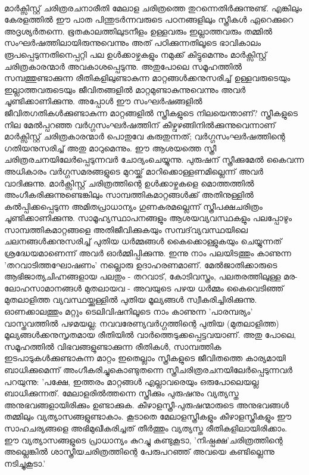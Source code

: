 \paragraph{} മാർക്സിസ്റ്റ് ചരിത്രരചനാരീതി മേലാള ചരിത്രത്തെ തുറന്നെതിർക്കുന്നുണ്ട്. എങ്കിലും കേരളത്തിൽ ഈ പാത പിന്തുടർന്നവരുടെ പഠനങ്ങളിലും സ്ത്രീകൾ ഏറെക്കുറെ അദൃശ്യർതന്നെ. ഭൂതകാലത്തിലുടനീളം ഉള്ളവരും ഇല്ലാത്തവരും തമ്മിൽ സംഘർഷത്തിലായിരുന്നുവെന്നും അത് പഠിക്കുന്നതിലൂടെ ഭാവികാലം രൂപപ്പെടുന്നതിനെപ്പറ്റി പല ഉൾക്കാഴ്ചകളും നമുക്ക് കിട്ടുമെന്നും മാർക്സിസ്റ്റ് ചരിത്രകാരന്മാർ അവകാശപ്പെടുന്നു. അതുപോലെ സമൂഹത്തിൽ സമ്പത്തുണ്ടാക്കുന്ന രീതികളിലുണ്ടാകുന്ന മാറ്റങ്ങൾക്കനുസരിച്ച് ഉള്ളവരുടെയും ഇല്ലാത്തവരുടെയും ജീവിതങ്ങളിൽ മാറ്റമുണ്ടാകുന്നുവെന്നും അവർ ചൂണ്ടിക്കാണിക്കുന്നു. അപ്പോൾ ഈ സംഘർഷങ്ങളിൽ ജീവിതഗതികൾക്കുണ്ടാകുന്ന മാറ്റങ്ങളിൽ സ്ത്രീകളുടെ നിലയെന്താണ്? സ്ത്രീകളുടെ നില മേൽപ്പറഞ്ഞ വർഗ്ഗസംഘർഷത്തിന് കീഴ്വഴങ്ങിനിൽക്കുന്നുവെന്നാണ് മാർക്സിസ്റ്റ് ചരിത്രകാരന്മാർ പൊതുവേ കരുതുന്നത്; വർഗ്ഗസംഘർഷത്തിന്റെ ഗതിയനുസരിച്ച് അതു മാറുമെന്നും. ഈ ആശയത്തെ സ്ത്രീ ചരിത്രരചനയിലേർപ്പെടുന്നവർ ചോദ്യംചെയ്യുന്നു. പുരുഷന് സ്ത്രീക്കുമേൽ കൈവന്ന അധികാരം വർഗ്ഗസമരങ്ങളുടെ മുറയ്ക്ക് മാറിക്കൊള്ളണമില്ലെന്ന് അവർ വാദിക്കുന്നു. മാർക്സിസ്റ്റ് ചരിത്രത്തിന്റെ ഉൾക്കാഴ്ചകളെ മൊത്തത്തിൽ അംഗീകരിക്കുന്നുണ്ടെങ്കിലും സാമ്പത്തികമാറ്റങ്ങൾക്ക് അതിനുള്ളിൽ കൽപ്പിക്കപ്പെടുന്ന അമിതപ്രാധാന്യം ഗുണകരമല്ലെന്ന് സ്ത്രീപക്ഷചരിത്രം ചൂണ്ടിക്കാണിക്കുന്നു. സാമൂഹ്യസ്ഥാപനങ്ങളും ആശയവ്യവസ്ഥകളും പലപ്പോഴും സാമ്പത്തികമാറ്റങ്ങളെ അതിജീവിക്കുകയും സമ്പദ്‌വ്യവസ്ഥയിലെ ചലനങ്ങൾക്കനുസരിച്ച് പുതിയ ധർമ്മങ്ങൾ കൈക്കൊള്ളുകയും ചെയ്യുന്നത് ശ്രദ്ധേയമാണെന്ന് അവർ ഓർമ്മിപ്പിക്കുന്നു. ഇന്നു നാം പലയിടത്തും കാണുന്ന 'തറവാടിത്തഘോഷണം' നല്ലൊരു ഉദാഹരണമാണ്. മേൽജാതിക്കാരുടെ ആഭിജാത്യചിഹ്നങ്ങളായ പലതും - തറവാട്, കോടിവസ്ത്രം, പലതരത്തിലുള്ള മര-ലോഹസാമാനങ്ങൾ മുതലായവ - അവയുടെ പഴയ ധർമ്മം കൈവെടിഞ്ഞ് മുതലാളിത്ത വ്യവസ്ഥയ്ക്കുള്ളിൽ പുതിയ മൂല്യങ്ങൾ സ്വീകരിച്ചിരിക്കുന്നു. ഓണക്കാലത്തും മറ്റും ടെലിവിഷനിലൂടെ നാം കാണുന്ന 'പാരമ്പര്യം' വാസ്തവത്തിൽ പഴമയല്ല; നവവരേണ്യവർഗ്ഗത്തിന്റെ പുതിയ (മുതലാളിത്ത) മൂല്യങ്ങൾക്കനുസൃതമായ രീതിയിൽ വാർത്തെടുക്കപ്പെട്ടവയാണ്. അതു പോലെ, സമൂഹത്തിൽ വിഭവങ്ങളുണ്ടാക്കുന്ന രീതികൾ, സാമ്പത്തിക ഇടപാടുകൾക്കുണ്ടാകുന്ന മാറ്റം ഇതെല്ലാം സ്ത്രീകളുടെ ജീവിതത്തെ കാര്യമായി ബാധിക്കുമെന്ന് അംഗീകരിച്ചുകൊണ്ടുതന്നെ സ്ത്രീചരിത്രരചനയിലേർപ്പെടുന്നവർ പറയുന്നു: 'പക്ഷേ, ഇത്തരം മാറ്റങ്ങൾ എല്ലാവരെയും ഒരുപോലെയല്ല ബാധിക്കുന്നത്. മേലാളരിൽത്തന്നെ സ്ത്രീക്കും പുരുഷനും വ്യത്യസ്ത അനുഭവങ്ങളായിരിക്കും ഉണ്ടാക്കുക. കീഴാളസ്ത്രീ-പുരുഷന്മാരുടെ അനുഭവങ്ങൾ തമ്മിലും വ്യത്യാസങ്ങളുണ്ടാകാം. കൂടാതെ മേലാളസ്ത്രീകളും കീഴാളസ്ത്രീകളും ഈ സാഹചര്യങ്ങളെ അഭിമുഖീകരിച്ചത് തീർത്തും വ്യത്യസ്ത രീതികളിലായിരിക്കാം. ഈ വ്യത്യാസങ്ങളുടെ പ്രാധാന്യം കുറച്ചു കണ്ടുകൂടാ, 'നിഷ്പക്ഷ'ചരിത്രത്തിന്റെ അല്ലെങ്കിൽ ശാസ്ത്രീയചരിത്രത്തിന്റെ പേരുപറഞ്ഞ് അവയെ കണ്ടില്ലെന്നു നടിച്ചുകൂടാ.'

